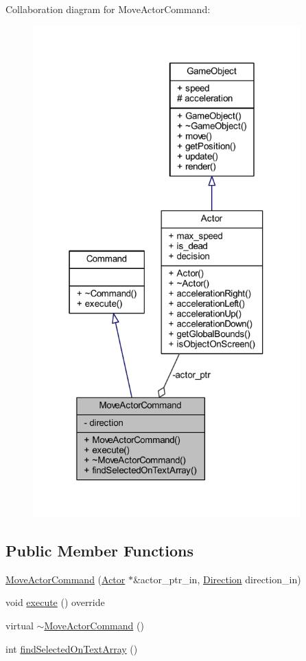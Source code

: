 Collaboration diagram for Move\+Actor\+Command\+:
\nopagebreak
\begin{figure}[H]
\begin{center}
\leavevmode
\includegraphics[width=292pt]{class_move_actor_command__coll__graph}
\end{center}
\end{figure}
\subsection*{Public Member Functions}
\begin{DoxyCompactItemize}
\item 
\hyperlink{class_move_actor_command_a5ccb3e4f5df4cb5347a7ef309eef3e41}{Move\+Actor\+Command} (\hyperlink{class_actor}{Actor} $\ast$\&actor\+\_\+ptr\+\_\+in, \hyperlink{class_command_a53ddb82f75ac3516b27d8f92f93c5e09}{Direction} direction\+\_\+in)
\item 
void \hyperlink{class_move_actor_command_a62ff2dc8808da57913d1e5aa43c10cfb}{execute} () override
\item 
virtual \hyperlink{class_move_actor_command_a6b826449c1ca94181966deaabeb02ede}{$\sim$\+Move\+Actor\+Command} ()
\item 
int \hyperlink{class_move_actor_command_a4e29605f2a8d05b9d91f622001b22749}{find\+Selected\+On\+Text\+Array} ()
\end{DoxyCompactItemize}
